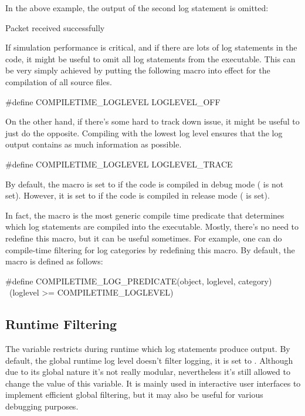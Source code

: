 In the above example, the output of the second log statement is omitted:

\begin{filelisting}
[INFO] Packet received successfully
\end{filelisting}

If simulation performance is critical, and if there are lots of log statements
in the code, it might be useful to omit all log statements from the executable.
This can be very simply achieved by putting the following macro into effect for
the compilation of all source files.

\begin{cpp}
#define COMPILETIME_LOGLEVEL LOGLEVEL_OFF
\end{cpp}

On the other hand, if there's some hard to track down issue, it might be useful
to just do the opposite. Compiling with the lowest log level ensures that the
log output contains as much information as possible.

\begin{cpp}
#define COMPILETIME_LOGLEVEL LOGLEVEL_TRACE
\end{cpp}

By default, the  macro is set to
 if the code is compiled in debug mode ( is
not set). However, it is set to  if the code is compiled
in release mode ( is set).

In fact, the  macro is the most generic compile
time predicate that determines which log statements are compiled into the executable.
Mostly, there's no need to redefine this macro, but it can be useful sometimes.
For example, one can do compile-time filtering for log categories by redefining
this macro. By default, the  macro is defined
as follows:

\begin{cpp}
#define COMPILETIME_LOG_PREDICATE(object, loglevel, category) \
        (loglevel >= COMPILETIME_LOGLEVEL)
\end{cpp}

\subsection{Runtime Filtering}
\label{sec:config-sim:runtime-log-filtering}

The  variable restricts during runtime which log statements
produce output. By default, the global runtime log level doesn't filter logging,
it is set to \fmac{LOGLEVEL\_TRACE}. Although due to its global nature it's not
really modular, nevertheless it's still allowed to change the value of this
variable. It is mainly used in interactive user interfaces to implement efficient
global filtering, but it may also be useful for various debugging purposes.

